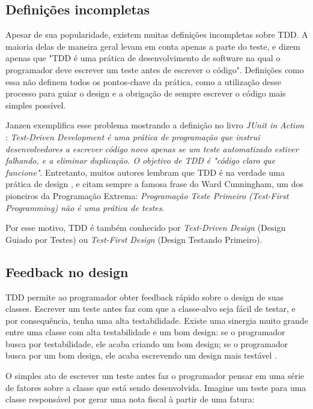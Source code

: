 \subsection{Definições incompletas} 
\label{sec:tdd-definicoes-incompletas}

Apesar de sua popularidade, existem muitas definições incompletas sobre TDD. A maioria delas de maneira geral levam em conta
apenas a parte do teste, e dizem apenas
que "TDD é uma prática de desenvolvimento de software na qual o programador deve escrever um teste antes de escrever o código".
Definições como essa não definem todos os pontos-chave da prática, como a utilização desse processo para guiar o design e
a obrigação de sempre escrever o código mais simples possível.

Janzen \cite{tdd-taxonomy} exemplifica esse problema mostrando a definição no livro \textit{JUnit in Action} \cite{junit-in-action}:
\textit{Test-Driven Development é uma prática de programação que instrui desenvolvedores a escrever código novo apenas se um teste
automatizado estiver falhando, e a eliminar duplicação. O objetivo de TDD é "código claro que funcione"}. 
Entretanto, muitos autores lembram que TDD é na verdade uma prática de design \cite{tdd-taxonomy} \cite{aim-fire}, 
e citam sempre a famosa frase do Ward Cunningham, um dos pioneiros da Programação Extrema:
\textit{Programação Teste Primeiro (Test-First Programming) não é uma prática de testes}. 

Por esse motivo, TDD é também conhecido por \textit{Test-Driven Design} (Design Guiado por Testes) ou \textit{Test-First Design}
(Design Testando Primeiro).

\subsection{Feedback no design}

TDD permite ao programador obter feedback rápido sobre o design de suas classes. Escrever um teste antes faz com que
a classe-alvo seja fácil de testar, e por consequência, tenha uma alta testabilidade. Existe uma sinergia muito
grande entre uma classe com alta testabilidade e um bom design: se o programador busca por testabilidade,
ele acaba criando um bom design; se o programador busca por um bom design, ele acaba escrevendo um design mais testável \cite{feathers-synergy}.  

O simples ato de escrever um teste antes faz o programador pensar em uma série de fatores 
sobre a classe que está sendo desenvolvida. Imagine um teste para uma 
classe responsável por gerar uma nota fiscal à partir de uma fatura:

